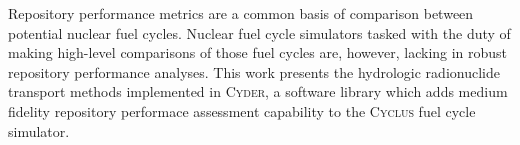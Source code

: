 Repository performance metrics are a common basis of comparison between 
potential nuclear fuel cycles. 
Nuclear fuel cycle simulators tasked with the duty of making high-level 
comparisons of those fuel cycles are, however, lacking in robust repository 
performance analyses. 
This work presents the hydrologic radionuclide transport methods implemented in 
\textsc{Cyder}, a software library which adds medium fidelity repository 
performace assessment capability to the \textsc{Cyclus} fuel cycle simulator.
